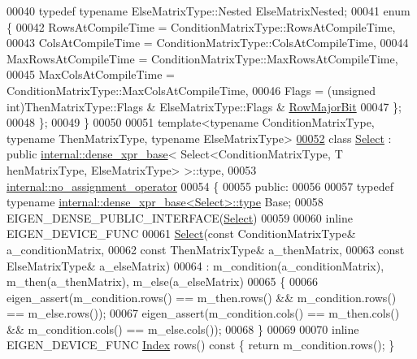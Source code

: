 \begin{DoxyCode}
00040   \textcolor{keyword}{typedef} \textcolor{keyword}{typename} ElseMatrixType::Nested ElseMatrixNested;
00041   \textcolor{keyword}{enum} \{
00042     RowsAtCompileTime = ConditionMatrixType::RowsAtCompileTime,
00043     ColsAtCompileTime = ConditionMatrixType::ColsAtCompileTime,
00044     MaxRowsAtCompileTime = ConditionMatrixType::MaxRowsAtCompileTime,
00045     MaxColsAtCompileTime = ConditionMatrixType::MaxColsAtCompileTime,
00046     Flags = (\textcolor{keywordtype}{unsigned} int)ThenMatrixType::Flags & ElseMatrixType::Flags & 
      \hyperlink{group__flags_gae4f56c2a60bbe4bd2e44c5b19cbe8762}{RowMajorBit}
00047   \};
00048 \};
00049 \}
00050 
00051 \textcolor{keyword}{template}<\textcolor{keyword}{typename} ConditionMatrixType, \textcolor{keyword}{typename} ThenMatrixType, \textcolor{keyword}{typename} ElseMatrixType>
\hyperlink{group___core___module}{00052} \textcolor{keyword}{class }\hyperlink{group___core___module_class_eigen_1_1_select}{Select} : \textcolor{keyword}{public} \hyperlink{struct_eigen_1_1internal_1_1dense__xpr__base}{internal::dense\_xpr\_base}< Select<ConditionMatrixType, T
      henMatrixType, ElseMatrixType> >::type,
00053                \hyperlink{class_eigen_1_1internal_1_1no__assignment__operator}{internal::no\_assignment\_operator}
00054 \{
00055   \textcolor{keyword}{public}:
00056 
00057     \textcolor{keyword}{typedef} \textcolor{keyword}{typename} \hyperlink{struct_eigen_1_1internal_1_1dense__xpr__base}{internal::dense\_xpr\_base<Select>::type} Base;
00058     EIGEN\_DENSE\_PUBLIC\_INTERFACE(\hyperlink{group___core___module_class_eigen_1_1_select}{Select})
00059 
00060     \textcolor{keyword}{inline} EIGEN\_DEVICE\_FUNC
00061     \hyperlink{group___core___module_class_eigen_1_1_select}{Select}(\textcolor{keyword}{const} ConditionMatrixType& a\_conditionMatrix,
00062            \textcolor{keyword}{const} ThenMatrixType& a\_thenMatrix,
00063            \textcolor{keyword}{const} ElseMatrixType& a\_elseMatrix)
00064       : m\_condition(a\_conditionMatrix), m\_then(a\_thenMatrix), m\_else(a\_elseMatrix)
00065     \{
00066       eigen\_assert(m\_condition.rows() == m\_then.rows() && m\_condition.rows() == m\_else.rows());
00067       eigen\_assert(m\_condition.cols() == m\_then.cols() && m\_condition.cols() == m\_else.cols());
00068     \}
00069 
00070     \textcolor{keyword}{inline} EIGEN\_DEVICE\_FUNC \hyperlink{namespace_eigen_a62e77e0933482dafde8fe197d9a2cfde}{Index} rows()\textcolor{keyword}{ const }\{ \textcolor{keywordflow}{return} m\_condition.rows(); \}

\end{DoxyCode}
